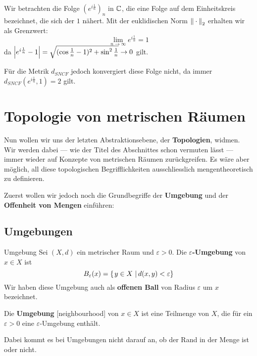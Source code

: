 \begin{example} Wir betrachten die Folge $(e^{i\frac{1}{n}})_n$ in $\mathbb{C}$, die eine Folge auf dem Einheitskreis bezeichnet, die sich der $1$ nähert. Mit der euklidischen Norm $\left\|\:\cdot\:\right\|_2$ erhalten wir als Grenzwert:
$$\lim_{n \to \infty} e^{i\frac{1}{n}} = 1$$
da $\left|e^{i\frac{1}{n}} - 1\right| = \sqrt{(\cos \frac{1}{n} - 1)^2 + \sin^2\frac{1}{n}} \to 0$ gilt. 

Für die Metrik $d_{SNCF}$ jedoch konvergiert diese Folge nicht, da immer $d_{SNCF}(e^{i\frac{1}{n}}, 1) = 2$ gilt.
\end{example}

\section{Topologie von metrischen Räumen}
Nun wollen wir uns der letzten Abstraktionsebene, der \textbf{Topologien}, widmen. Wir werden dabei --- wie der Titel des Abschnittes schon vermuten lässt --- immer wieder auf Konzepte von metrischen Räumen zurückgreifen. Es wäre aber möglich, all diese topologischen Begrifflichkeiten ausschliesslich mengentheoretisch zu definieren. 

Zuerst wollen wir jedoch noch die Grundbegriffe der \textbf{Umgebung} und der \textbf{Offenheit von Mengen} einführen:

\subsection{Umgebungen}
\begin{definition}{Umgebung}{}
Sei $(X,d)$ ein metrischer Raum und $\varepsilon > 0$. Die \textbf{$\varepsilon$-Umgebung} von $x \in X$ ist
$$B_\varepsilon(x) = \left\{\left.y \in X \ \right| d(x,y)<\varepsilon \right\}$$
Wir haben diese Umgebung auch als \textbf{offenen Ball} von Radius $\varepsilon$ um $x$ bezeichnet. 

Die \textbf{Umgebung} [neighbourhood] von $x \in X$ ist eine Teilmenge von $X$, die für ein $\varepsilon > 0$ eine $\varepsilon$-Umgebung enthält. 
\end{definition}
Dabei kommt es bei Umgebungen nicht darauf an, ob der Rand in der Menge ist oder nicht.

